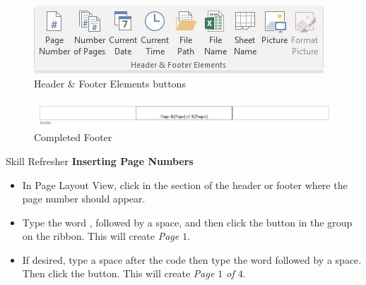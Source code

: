 \begin{figure}[H]
	\centering
	\includegraphics[width=\maxwidth{.95\linewidth}]{gfx/ch03_fig32}
	\caption{Header \& Footer Elements buttons}
	\label{03:fig32}
\end{figure}

\begin{figure}[H]
	\centering
	\includegraphics[width=\maxwidth{.95\linewidth}]{gfx/ch03_fig33}
	\caption{Completed Footer}
	\label{03:fig33}
\end{figure}

\begin{center}
	\begin{sklbox}{Skill Refresher}
		\textbf{Inserting Page Numbers}
		\\
		\begin{itemize}
			\setlength{\itemsep}{0pt}
			\setlength{\parskip}{0pt}
			\setlength{\parsep}{0pt}

			\item In Page Layout View, click in the section of the header or footer where the page number should appear.
			\item Type the word , followed by a space, and then click the  button in the  group on the  ribbon. This will create \textit{Page $ 1 $}.
			\item If desired, type a space after the \fmtTyping{\&[Page]} code then type the word  followed by a space. Then click the  button. This will create \textit{Page $ 1 $ of $ 4 $}.
			
		\end{itemize}
	\end{sklbox}
\end{center}

